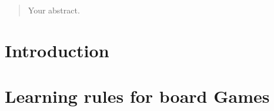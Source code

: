 \documentclass[12pt,twoside]{report}
\date{September 2017}
\begin{document}



\clearpage{\pagestyle{empty}\cleardoublepage}
\setcounter{page}{1}

\begin{abstract}
Your abstract.
\end{abstract}

\cleardoublepage

\clearpage{\pagestyle{empty}\cleardoublepage}

\tableofcontents 


\clearpage{\pagestyle{empty}\cleardoublepage}
\setcounter{page}{1}






\chapter{Introduction}












\chapter{Learning rules for board Games}
\end{document}
